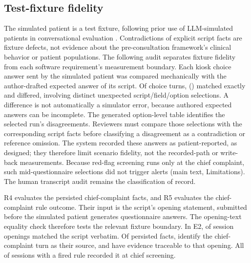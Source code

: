 \subsection{Test-fixture fidelity}\label{sup:simfidelity}
The simulated patient is a test fixture, following prior use of LLM-simulated
patients in conversational evaluation
\citep{johriCraftMd2025,schmidgallAgentClinic2024}. Contradictions of explicit script facts
are fixture defects, not evidence about the pre-consultation framework's clinical
behavior or patient populations. The following audit separates fixture fidelity
from each software requirement's measurement boundary.
Each kiosk choice answer sent by the simulated patient was compared mechanically
with the author-drafted expected answer of its script. Of \ETwoSimChoiceTurns{}
choice turns, \ETwoSimChoiceAgree{} (\ETwoSimChoiceAgreeRate{}) matched exactly and
\ETwoSimChoiceDiffer{} differed, involving \ETwoSimUnexpectedOptions{} distinct
unexpected script/field/option selections. A difference is not automatically a
simulator error, because authored expected answers can be incomplete. The generated option-level table identifies the selected run's disagreements.
Reviewers must compare those selections with the corresponding script facts
before classifying a disagreement as a contradiction or reference omission.
The system recorded these answers as patient-reported, as designed;
they therefore limit scenario fidelity, not the recorded-path or write-back
measurements. Because red-flag screening runs only at the chief complaint, such
mid-questionnaire selections did not trigger alerts (main text, Limitations). The
human transcript audit remains the classification of record.


R4 evaluates the persisted chief-complaint facts, and R5 evaluates the
chief-complaint rule outcome. Their input is the script's opening statement,
submitted before the simulated patient generates questionnaire answers. The
opening-text equality check therefore tests the relevant fixture boundary.
In E2, \ETwoFixtureOpeningAgree{} of \ETwoFixtureSessions{} session openings
matched the script verbatim. Of \ETwoFixtureFacts{} persisted facts,
\ETwoFixtureFactsFromChief{} identify the chief-complaint turn as their source,
and \ETwoFixtureFactsTraceableToChief{} have evidence traceable to that opening.
All \ETwoFixtureFiredRuleChiefSessions{} of \ETwoFixtureFiredRuleSessions{}
sessions with a fired rule recorded it at chief screening.

